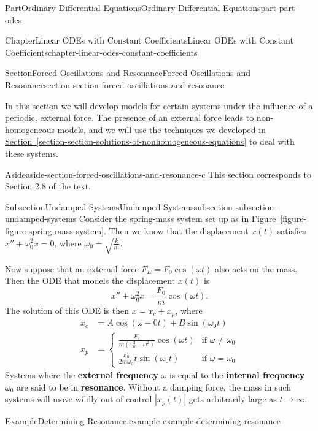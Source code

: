 \documentclass[twoside,10pt,]{book}
\newcommand{\xreffont}{\relax}
\newcommand{\terminology}[1]{\textbf{#1}}
\numberwithin{equation}{part}
\begin{document}
\begin{partptx}{Part}{Ordinary Differential Equations}{}{Ordinary Differential Equations}{}{}{part-part-odes}
\begin{chapterptx}{Chapter}{Linear ODEs with Constant Coefficients}{}{Linear ODEs with Constant Coefficients}{}{}{chapter-linear-odes-constant-coefficients}
\begin{sectionptx}{Section}{Forced Oscillations and Resonance}{}{Forced Oscillations and Resonance}{}{}{section-section-forced-oscillations-and-resonance}
\begin{introduction}{}
In this section we will develop models for certain systems under the influence of a periodic, external force. The presence of an external force leads to non-homogeneous models, and we will use the techniques we developed in \hyperref[section-section-solutions-of-nonhomogeneous-equations]{Section~{\xreffont\ref{section-section-solutions-of-nonhomogeneous-equations}}} to deal with these systems.%
\end{introduction}%
\begin{aside}{Aside}{}{aside-section-forced-oscillations-and-resonance-c}%
This section corresponds to Section 2.8 of the text.%
\end{aside}
%
%
\typeout{************************************************}
\typeout{************************************************}
%
\begin{subsectionptx}{Subsection}{Undamped Systems}{}{Undamped Systems}{}{}{subsection-subsection-undamped-systems}
Consider the spring-mass system set up as in \hyperref[figure-figure-spring-mass-system]{Figure~{\xreffont\ref{figure-figure-spring-mass-system}}}. Then we know that the displacement \(x(t)\) satisfies \(x'' + \omega_{0}^{2}x = 0\), where \(\omega_{0} = \sqrt{\frac{k}{m}}\).%
\par
Now suppose that an external force \(F_{E} = F_{0}\cos(\omega t)\) also acts on the mass. Then the ODE that models the displacement \(x(t)\) is%
\begin{equation*}
x'' + \omega_{0}^{2}x = \frac{F_{0}}{m}\cos(\omega t).
\end{equation*}
The solution of this ODE is then \(x = x_{c} + x_{p}\), where%
\begin{align*}
x_{c} &= A\cos(\omega-{0}t) + B\sin(\omega_{0}t)\\
x_{p} &= \begin{cases} \frac{F_{0}}{m(\omega_{0}^{2} - \omega^{2})} \cos(\omega t) &\text{if }\omega\neq\omega_{0} \\ \frac{F_{0}}{2m\omega_{0}} t\sin(\omega_{0} t) &\text{if }\omega=\omega_{0} \end{cases}
\end{align*}
Systems where the \terminology{external frequency} \(\omega\) is equal to the \terminology{internal frequency} \(\omega_{0}\) are said to be in \terminology{resonance}. Without a damping force, the mass in such systems will move wildly out of control \(|x_{p}(t)|\) gets arbitrarily large as \(t\to\infty\).%
\begin{example}{Example}{Determining Resonance.}{example-example-determining-resonance}%

\end{example}
\end{subsectionptx}
\end{sectionptx}
\end{chapterptx}
\end{partptx}
\end{document}
